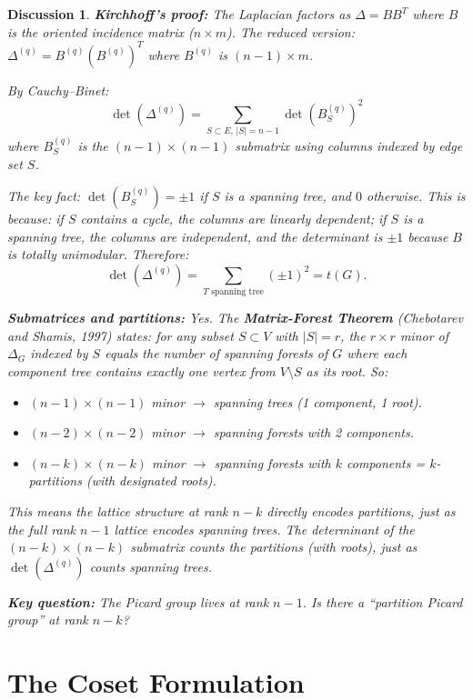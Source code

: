 \documentclass[11pt]{article}
\newtheorem{answer}{Discussion}
\begin{document}
\begin{answer}
\textbf{Kirchhoff's proof:} The Laplacian factors as $\Delta = BB^T$ where
$B$ is the oriented incidence matrix ($n \times m$). The reduced version:
$\Delta^{(q)} = B^{(q)} (B^{(q)})^T$ where $B^{(q)}$ is $(n-1) \times m$.

By Cauchy--Binet:
\[
  \det(\Delta^{(q)}) = \sum_{S \subset E,\, |S|=n-1} \det(B^{(q)}_S)^2
\]
where $B^{(q)}_S$ is the $(n-1) \times (n-1)$ submatrix using columns indexed
by edge set $S$.

The key fact: $\det(B^{(q)}_S) = \pm 1$ if $S$ is a spanning tree, and $0$
otherwise. This is because: if $S$ contains a cycle, the columns are linearly
dependent; if $S$ is a spanning tree, the columns are independent, and the
determinant is $\pm 1$ because $B$ is totally unimodular. Therefore:
\[
  \det(\Delta^{(q)}) = \sum_{T \text{ spanning tree}} (\pm 1)^2 = t(G).
\]

\textbf{Submatrices and partitions:} Yes. The \textbf{Matrix-Forest Theorem}
(Chebotarev and Shamis, 1997) states: for any subset $S \subset V$ with
$|S| = r$, the $r \times r$ minor of $\Delta_G$ indexed by $S$ equals the
number of spanning forests of $G$ where each component tree contains exactly
one vertex from $V \setminus S$ as its root. So:
\begin{itemize}
  \item $(n-1) \times (n-1)$ minor $\to$ spanning trees (1 component,
    1 root).
  \item $(n-2) \times (n-2)$ minor $\to$ spanning forests with 2 components.
  \item $(n-k) \times (n-k)$ minor $\to$ spanning forests with $k$
    components = $k$-partitions (with designated roots).
\end{itemize}

This means the lattice structure at rank $n-k$ directly encodes partitions,
just as the full rank $n-1$ lattice encodes spanning trees. The determinant
of the $(n-k) \times (n-k)$ submatrix counts the partitions (with roots),
just as $\det(\Delta^{(q)})$ counts spanning trees.

\textbf{Key question:} The Picard group lives at rank $n-1$. Is there a
``partition Picard group'' at rank $n-k$?
\end{answer}


\section{The Coset Formulation}
\end{document}

